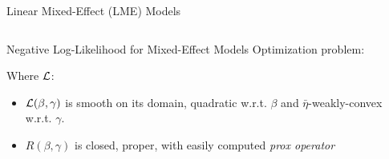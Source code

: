 \documentclass[8pt]{beamer}
\begin{document}
\begin{frame}{Linear Mixed-Effect (LME) Models}
\begin{columns}[T,onlytextwidth]
   	
  \end{columns}
\end{frame}

%   	



\begin{frame}{Negative Log-Likelihood for Mixed-Effect Models}
Optimization problem:

Where $\operatorname{\mathcal{L}}$:
\begin{itemize}
	\item $\operatorname{\mathcal{L}}(\beta, \gamma)$ is smooth on its domain, quadratic w.r.t. $\beta$ and $\bar\eta$-weakly-convex w.r.t. $\gamma$.
	\item $R(\beta, \gamma)$ is closed, proper, with easily computed \textit{prox operator}
\end{itemize}

\end{frame}
\end{document}
